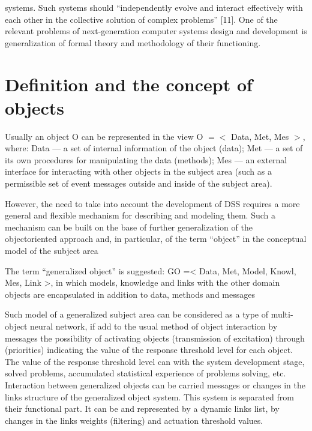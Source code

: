 \documentclass[10pt, a4paper]{article}
\begin{document}
\begin{multicols}{2}
\noindent systems. Such systems should “independently evolve and
interact effectively with each other in the collective
solution of complex problems” [11]. One of the relevant
problems of next-generation computer systems design
and development is generalization of formal theory and
methodology of their functioning.

\section{Definition and the concept of objects}
Usually an object O can be represented in the view
O $=<$ Data, Met, Mes $>$, where: Data — a set of
internal information of the object (data); Met — a set of
its own procedures for manipulating the data (methods);
Mes — an external interface for interacting with other
objects in the subject area (such as a permissible set of
event messages outside and inside of the subject area).

However, the need to take into account the development
of DSS requires a more general and flexible mechanism
for describing and modeling them. Such a mechanism can
be built on the base of further generalization of the objectoriented approach and, in particular, of the term “object”
in the conceptual model of the subject area

The term “generalized object” is suggested: GO =<
Data, Met, Model, Knowl, Mes, Link >, in which
models, knowledge and links with the other domain
objects are encapsulated in addition to data, methods and
messages

Such model of a generalized subject area can be
considered as a type of multi-object neural network, if
add to the usual method of object interaction by messages
the possibility of activating objects (transmission of
excitation) through (priorities)
indicating the value of the response threshold level for
each object. The value of the response threshold level
can with the system development
stage, solved problems, accumulated statistical experience
of problems solving, etc. Interaction between generalized
objects can be carried messages or changes in
the links structure of the generalized object system. This
system is separated from their functional part. It can be
and represented by a dynamic links list, by changes in the
links weights (filtering) and actuation threshold values.


\end{multicols}
\end{document}
